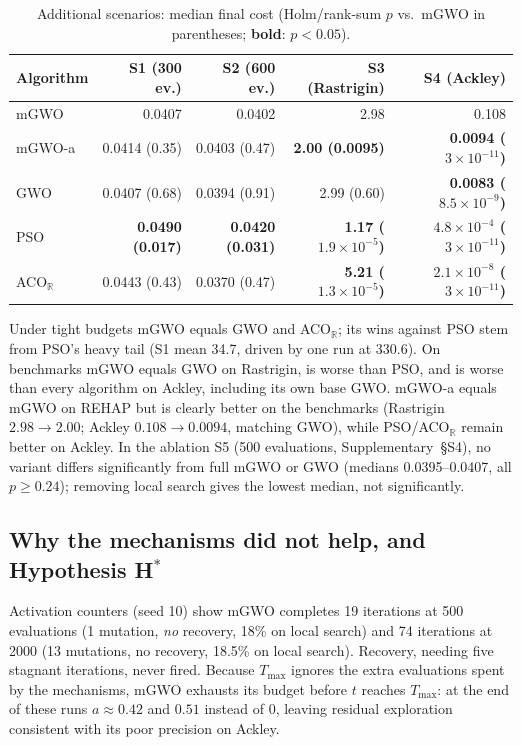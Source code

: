 \documentclass[10pt,journal,compsoc]{IEEEtran}
\newcommand{\mgwo}{mGWO}
\newcommand{\mgwoa}{mGWO-a}
\newcommand{\acor}{ACO$_\mathbb{R}$}
\newcommand{\rehap}{REHAP}
\begin{document}
\begin{table}[t]
\centering\footnotesize
\caption{Additional scenarios: median final cost (Holm/rank-sum $p$ vs.\ \mgwo{} in parentheses; \textbf{bold}: $p<0.05$).}
\label{tab:scen}
\begin{tabular}{lrrrr}
\toprule
Algorithm & S1 (300 ev.) & S2 (600 ev.) & S3 (Rastrigin) & S4 (Ackley)\\
\midrule
\mgwo{}  & 0.0407 & 0.0402 & 2.98 & 0.108\\
\mgwoa{} & 0.0414 (0.35) & 0.0403 (0.47) & \textbf{2.00 (0.0095)} & \textbf{0.0094 ($3{\times}10^{-11}$)}\\
GWO      & 0.0407 (0.68) & 0.0394 (0.91) & 2.99 (0.60) & \textbf{0.0083 ($8.5{\times}10^{-9}$)}\\
PSO      & \textbf{0.0490 (0.017)} & \textbf{0.0420 (0.031)} & \textbf{1.17 ($1.9{\times}10^{-5}$)} & \textbf{$4.8{\times}10^{-4}$ ($3{\times}10^{-11}$)}\\
\acor{}  & 0.0443 (0.43) & 0.0370 (0.47) & \textbf{5.21 ($1.3{\times}10^{-5}$)} & \textbf{$2.1{\times}10^{-8}$ ($3{\times}10^{-11}$)}\\
\bottomrule
\end{tabular}
\end{table}

Under tight budgets \mgwo{} equals GWO and \acor{}; its wins against PSO stem from PSO's heavy tail (S1 mean 34.7, driven by one run at 330.6). On benchmarks \mgwo{} equals GWO on Rastrigin, is worse than PSO, and is worse than every algorithm on Ackley, including its own base GWO. \mgwoa{} equals \mgwo{} on \rehap{} but is clearly better on the benchmarks (Rastrigin $2.98\to2.00$; Ackley $0.108\to0.0094$, matching GWO), while PSO/\acor{} remain better on Ackley. In the ablation S5 (500 evaluations, Supplementary~\S S4), no variant differs significantly from full \mgwo{} or GWO (medians 0.0395--0.0407, all $p\ge0.24$); removing local search gives the lowest median, not significantly.

\subsection{Why the mechanisms did not help, and Hypothesis H$^\ast$}\label{sec:mech}\label{sec:hyp}
Activation counters (seed 10) show \mgwo{} completes 19 iterations at 500 evaluations (1 mutation, \emph{no} recovery, 18\% on local search) and 74 iterations at 2000 (13 mutations, no recovery, 18.5\% on local search). Recovery, needing five stagnant iterations, never fired. Because $T_{\max}$ ignores the extra evaluations spent by the mechanisms, \mgwo{} exhausts its budget before $t$ reaches $T_{\max}$: at the end of these runs $a\approx0.42$ and $0.51$ instead of $0$, leaving residual exploration consistent with its poor precision on Ackley.
\end{document}
